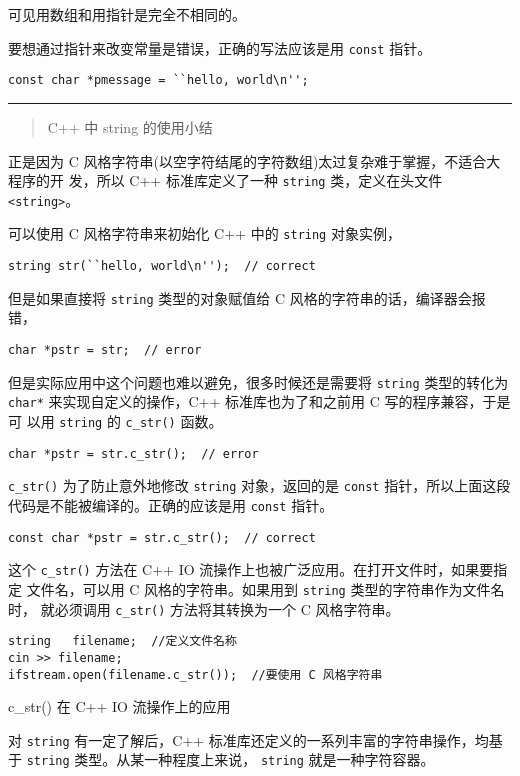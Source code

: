 可见用数组和用指针是完全不相同的。

要想通过指针来改变常量是错误，正确的写法应该是用 \verb|const| 指针。

\verb|const char *pmessage = ``hello, world\n'';|

\noindent\rule[0.25\baselineskip]{\textwidth}{1pt}

\begin{quotation}
  {\color{red} C++ 中 string 的使用小结}
\end{quotation}

正是因为 C 风格字符串(以空字符结尾的字符数组)太过复杂难于掌握，不适合大程序的开
发，所以 C++ 标准库定义了一种 \verb|string| 类，定义在头文件 \verb|<string>|。

可以使用 C 风格字符串来初始化 C++ 中的 \verb|string| 对象实例，

\verb|string str(``hello, world\n'');  // correct|

\noindent 但是如果直接将 \verb|string| 类型的对象赋值给 C 风格的字符串的话，编译器会报错，

\verb|char *pstr = str;  // error|

\noindent 但是实际应用中这个问题也难以避免，很多时候还是需要将 \verb|string| 类型的转化为
\verb|char*| 来实现自定义的操作，C++ 标准库也为了和之前用 C 写的程序兼容，于是可
以用 \verb|string| 的 \verb|c_str()| 函数。

\verb|char *pstr = str.c_str();  // error|

\noindent\verb|c_str()| 为了防止意外地修改 \verb|string| 对象，返回的是 \verb|const|
指针，所以上面这段代码是不能被编译的。正确的应该是用 \verb|const| 指针。

\verb|const char *pstr = str.c_str();  // correct|

这个 \verb|c_str()| 方法在 C++ IO 流操作上也被广泛应用。在打开文件时，如果要指定
文件名，可以用 C 风格的字符串。如果用到 \verb|string| 类型的字符串作为文件名时，
就必须调用 \verb|c_str()| 方法将其转换为一个 C 风格字符串。

\begin{sourcecode}[hbtp]
\begin{Verbatim}
string   filename;  //定义文件名称
cin >> filename;
ifstream.open(filename.c_str());  //要使用 C 风格字符串
\end{Verbatim}
\caption{c\_str() 在 C++ IO 流操作上的应用}
\end{sourcecode}

对 \verb|string| 有一定了解后，C++ 标准库还定义的一系列丰富的字符串操作，均基于
\verb|string| 类型。从某一种程度上来说， \verb|string| 就是一种字符容器。

